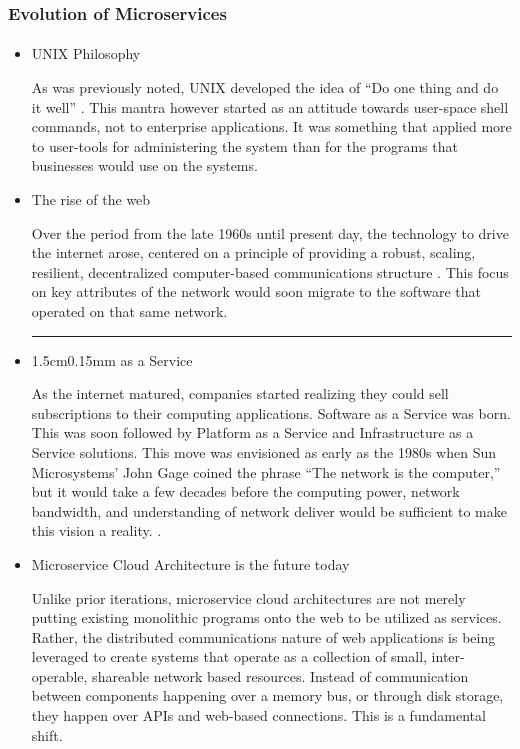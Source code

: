 \begin{frame}
  \frametitle{Evolution of Microservices}
  \framesubtitle{}
  \begin{itemize}
    \item<1-> UNIX Philosophy

           {\scriptsize{As was previously noted, UNIX developed the idea of ``Do one thing and do it well'' \parencite{mcilroyBSTJ57JulyAugust1978}. This mantra however started as an attitude towards user-space shell commands, not to enterprise applications. It was something that applied more to user-tools for administering the system than for the programs that businesses would use on the systems. }}

    \item<2-> The rise of the web

           {\scriptsize{Over the period from the late 1960s until present day, the technology to drive the internet arose, centered on a principle of providing a robust, scaling, resilient, decentralized computer-based communications structure \parencite{leinerBriefHistoryInternet2009}. This focus on key attributes of the network would soon migrate to the software that operated on that same network. }}

    \item<3-> \hrule{1.5cm}{0.15mm} as a Service

           {\scriptsize{As the internet matured, companies started realizing they could sell subscriptions to their computing applications. Software as a Service was born. This was soon followed by Platform as a Service and Infrastructure as a Service solutions. This move was envisioned as early as the 1980s when Sun Microsystems' John Gage coined the phrase ``The network is the computer,'' but it would take a few decades before the computing power, network bandwidth, and understanding of network deliver would be sufficient to make this vision a reality. \parencite{DoesRepurposingSun,surbiryalaCloudComputingHistory2019}.}}

    \item<4-> Microservice Cloud Architecture is the future today

           {\scriptsize{Unlike prior iterations, microservice cloud architectures are not merely putting existing monolithic programs onto the web to be utilized as services. Rather, the distributed communications nature of web applications is being leveraged to create systems that operate as a collection of small, inter-operable, shareable network based resources. Instead of communication between components happening over a memory bus, or through disk storage, they happen over APIs and web-based connections. This is a fundamental shift.}}

  \end{itemize}
\end{frame}
